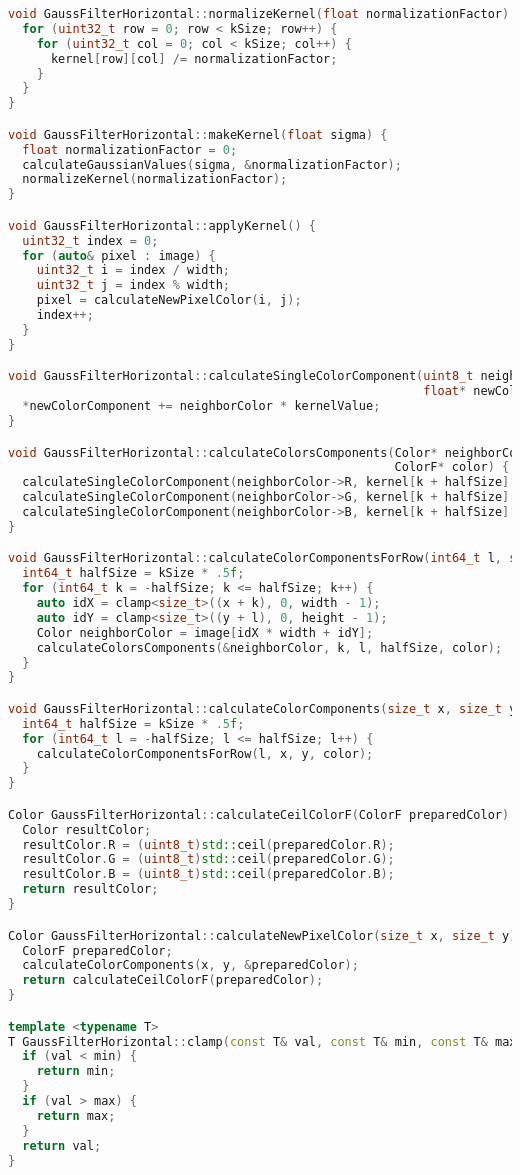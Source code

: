 \documentclass{report}
\begin{document}
\begin{lstlisting}[language=C++,caption=Последовательная версия]
void GaussFilterHorizontal::normalizeKernel(float normalizationFactor) {
  for (uint32_t row = 0; row < kSize; row++) {
    for (uint32_t col = 0; col < kSize; col++) {
      kernel[row][col] /= normalizationFactor;
    }
  }
}

void GaussFilterHorizontal::makeKernel(float sigma) {
  float normalizationFactor = 0;
  calculateGaussianValues(sigma, &normalizationFactor);
  normalizeKernel(normalizationFactor);
}

void GaussFilterHorizontal::applyKernel() {
  uint32_t index = 0;
  for (auto& pixel : image) {
    uint32_t i = index / width;
    uint32_t j = index % width;
    pixel = calculateNewPixelColor(i, j);
    index++;
  }
}

void GaussFilterHorizontal::calculateSingleColorComponent(uint8_t neighborColor, float kernelValue,
                                                          float* newColorComponent) {
  *newColorComponent += neighborColor * kernelValue;
}

void GaussFilterHorizontal::calculateColorsComponents(Color* neighborColor, int64_t k, int64_t l, int64_t halfSize,
                                                      ColorF* color) {
  calculateSingleColorComponent(neighborColor->R, kernel[k + halfSize][l + halfSize], &color->R);
  calculateSingleColorComponent(neighborColor->G, kernel[k + halfSize][l + halfSize], &color->G);
  calculateSingleColorComponent(neighborColor->B, kernel[k + halfSize][l + halfSize], &color->B);
}

void GaussFilterHorizontal::calculateColorComponentsForRow(int64_t l, size_t x, size_t y, ColorF* color) {
  int64_t halfSize = kSize * .5f;
  for (int64_t k = -halfSize; k <= halfSize; k++) {
    auto idX = clamp<size_t>((x + k), 0, width - 1);
    auto idY = clamp<size_t>((y + l), 0, height - 1);
    Color neighborColor = image[idX * width + idY];
    calculateColorsComponents(&neighborColor, k, l, halfSize, color);
  }
}

void GaussFilterHorizontal::calculateColorComponents(size_t x, size_t y, ColorF* color) {
  int64_t halfSize = kSize * .5f;
  for (int64_t l = -halfSize; l <= halfSize; l++) {
    calculateColorComponentsForRow(l, x, y, color);
  }
}

Color GaussFilterHorizontal::calculateCeilColorF(ColorF preparedColor) {
  Color resultColor;
  resultColor.R = (uint8_t)std::ceil(preparedColor.R);
  resultColor.G = (uint8_t)std::ceil(preparedColor.G);
  resultColor.B = (uint8_t)std::ceil(preparedColor.B);
  return resultColor;
}

Color GaussFilterHorizontal::calculateNewPixelColor(size_t x, size_t y) {
  ColorF preparedColor;
  calculateColorComponents(x, y, &preparedColor);
  return calculateCeilColorF(preparedColor);
}

template <typename T>
T GaussFilterHorizontal::clamp(const T& val, const T& min, const T& max) {
  if (val < min) {
    return min;
  }
  if (val > max) {
    return max;
  }
  return val;
}
\end{lstlisting}
\end{document}
